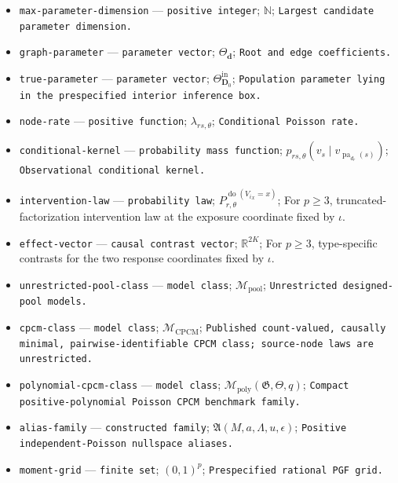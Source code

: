 \documentclass{article}
\begin{document}
\begin{itemize}
  \item \texttt{max-\allowbreak{}parameter-\allowbreak{}dimension} --- \texttt{positive integer}; \(\mathbb N\); \texttt{Largest candidate parameter dimension.}
  \item \texttt{graph-\allowbreak{}parameter} --- \texttt{parameter vector}; \(\Theta_{\boldsymbol d}\); \texttt{Root and edge coefficients.}
  \item \texttt{true-\allowbreak{}parameter} --- \texttt{parameter vector}; \(\Theta^{\mathrm{in}}_{\boldsymbol D_0}\); \texttt{Population parameter lying in the prespecified interior inference box.}
  \item \texttt{node-\allowbreak{}rate} --- \texttt{positive function}; \(\lambda_{rs,\theta}\); \texttt{Conditional Poisson rate.}
  \item \texttt{conditional-\allowbreak{}kernel} --- \texttt{probability mass function}; \(p_{rs,\theta}(v_s\mid v_{\operatorname{pa}_{d_r}(s)})\); \texttt{Observational conditional kernel.}
  \item \texttt{intervention-\allowbreak{}law} --- \texttt{probability law}; \(P_{r,\theta}^{\operatorname{do}(V_{i_X}=x)}\); For \(p\geq3\), truncated-factorization intervention law at the exposure coordinate fixed by \(\iota\).
  \item \texttt{effect-\allowbreak{}vector} --- \texttt{causal contrast vector}; \(\mathbb R^{2K}\); For \(p\geq3\), type-specific contrasts for the two response coordinates fixed by \(\iota\).
  \item \texttt{unrestricted-\allowbreak{}pool-\allowbreak{}class} --- \texttt{model class}; \(\mathcal M_{\mathrm{pool}}\); \texttt{Unrestricted designed-\allowbreak{}pool models.}
  \item \texttt{cpcm-\allowbreak{}class} --- \texttt{model class}; \(\mathcal M_{\mathrm{CPCM}}\); \texttt{Published count-\allowbreak{}valued,\allowbreak{} causally minimal,\allowbreak{} pairwise-\allowbreak{}identifiable CPCM class;\allowbreak{} source-\allowbreak{}node laws are unrestricted.}
  \item \texttt{polynomial-\allowbreak{}cpcm-\allowbreak{}class} --- \texttt{model class}; \(\mathcal M_{\mathrm{poly}}(\mathfrak G,\Theta,q)\); \texttt{Compact positive-\allowbreak{}polynomial Poisson CPCM benchmark family.}
  \item \texttt{alias-\allowbreak{}family} --- \texttt{constructed family}; \(\mathfrak A(M,a,\Lambda,u,\epsilon)\); \texttt{Positive independent-\allowbreak{}Poisson nullspace aliases.}
  \item \texttt{moment-\allowbreak{}grid} --- \texttt{finite set}; \((0,1)^p\); \texttt{Prespecified rational PGF grid.}

\end{itemize}
\end{document}
